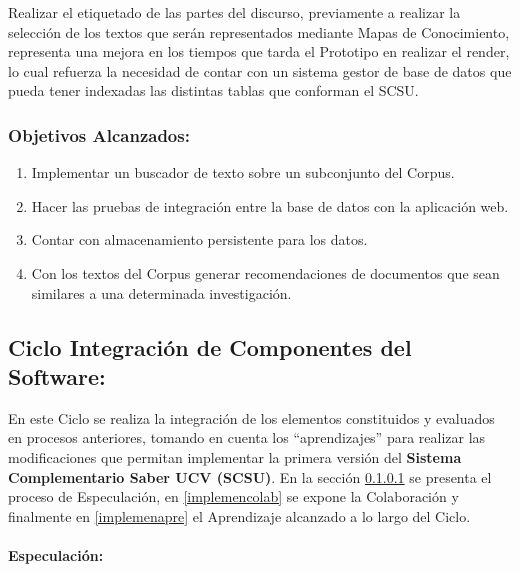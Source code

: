 \documentclass[
  12pt,
  openany]{book}
\begin{document}
Realizar el etiquetado de las partes del discurso, previamente a realizar la selección de los textos que serán representados mediante Mapas de Conocimiento, representa una mejora en los tiempos que tarda el Prototipo en realizar el render, lo cual refuerza la necesidad de contar con un sistema gestor de base de datos que pueda tener indexadas las distintas tablas que conforman el SCSU.

\hypertarget{objetivos-alcanzados-1}{%
\subsubsection{Objetivos Alcanzados:}\label{objetivos-alcanzados-1}}

\begin{enumerate}
\def\labelenumi{\arabic{enumi}.}
\item
  Implementar un buscador de texto sobre un subconjunto del Corpus.
\item
  Hacer las pruebas de integración entre la base de datos con la aplicación web.
\item
  Contar con almacenamiento persistente para los datos.
\item
  Con los textos del Corpus generar recomendaciones de documentos que sean similares a una determinada investigación.
\end{enumerate}

\newpage

\hypertarget{desarrollociclos4}{%
\subsection{Ciclo Integración de Componentes del Software:}\label{desarrollociclos4}}

En este Ciclo se realiza la integración de los elementos constituidos y evaluados en procesos anteriores, tomando en cuenta los ``aprendizajes'' para realizar las modificaciones que permitan implementar la primera versión del \textbf{Sistema Complementario Saber UCV (SCSU)}. En la sección \ref{implemenesp} se presenta el proceso de Especulación, en \ref{implemencolab} se expone la Colaboración y finalmente en \ref{implemenapre} el Aprendizaje alcanzado a lo largo del Ciclo.

\hypertarget{implemenesp}{%
\paragraph{Especulación:}\label{implemenesp}}
\end{document}
